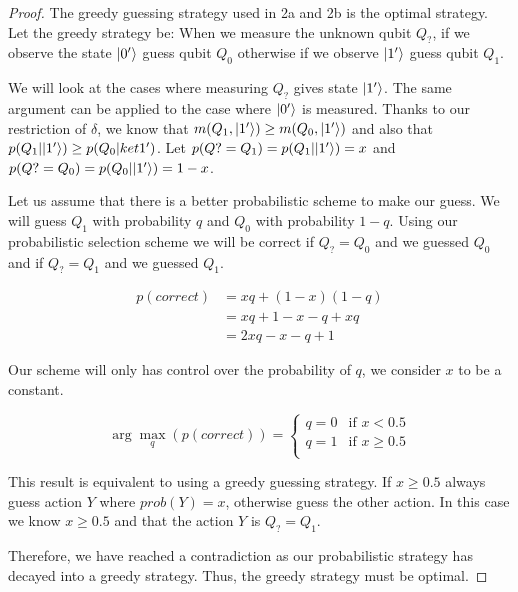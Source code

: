 \begin{proof} The greedy guessing strategy used in 2a and 2b is the optimal strategy.
Let the greedy strategy be: When we measure the unknown qubit $Q_?$, if we observe the state $\lvert0'\rangle$ guess qubit $Q_0$ otherwise if we observe $\lvert1'\rangle$ guess qubit $Q_1$.

We will look at the cases where measuring $Q_?$ gives state $\lvert1'\rangle$.
The same argument can be applied to the case where $\lvert0'\rangle$ is measured.
Thanks to our restriction of $\delta$, we know that $m(Q_1, \lvert1'\rangle)\geq m(Q_0, \lvert1'\rangle)$ and also that $p(Q_1|\lvert1'\rangle) \geq p(Q_0|ket{1'})$.
Let $p(Q? = Q_1) = p(Q_1|\lvert1'\rangle) = x$ and $p(Q? = Q_0) = p(Q_0|\lvert1'\rangle) = 1-x$.

Let us assume that there is a better probabilistic scheme to make our guess.
We will guess $Q_1$ with probability $q$ and $Q_0$ with probability $1-q$.
Using our probabilistic selection scheme we will be correct if $Q_?=Q_0$ and we guessed $Q_0$ and if $Q_?=Q_1$ and we guessed $Q_1$.

\begin{align*}
    p(correct) &= xq + (1-x)(1-q)\\
    &= xq + 1-x-q+xq\\
    &= 2xq-x-q+1
\end{align*}

Our scheme will only has control over the probability of $q$, we consider $x$ to be a constant.

\[
    \arg \max_q(p(correct)) = \begin{cases}
        q = 0 & \text{if } x<0.5\\
        q = 1 & \text{if } x\geq 0.5\\
    \end{cases}
\]

This result is equivalent to using a greedy guessing strategy.
If $x\geq 0.5$ always guess action $Y$ where $prob(Y)=x$, otherwise guess the other action.
In this case we know $x\geq 0.5$ and that the action $Y$ is $Q_? = Q_1$.

Therefore, we have reached a contradiction as our probabilistic strategy has decayed into a greedy strategy.
Thus, the greedy strategy must be optimal. 
\end{proof}